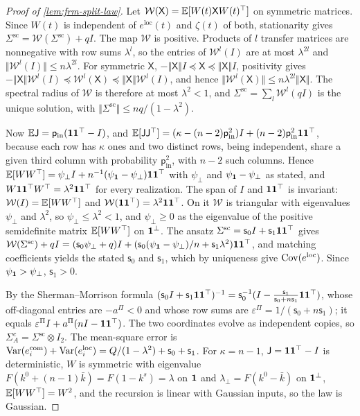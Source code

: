 \begin{proof}[Proof of \cref{lem:frm-split-law}]
Let $\mathcal W(\mathsf X)=\mathbb{E}[W(t)\mathsf XW(t)^\top]$ on symmetric matrices. Since $W(t)$ is independent of $e^{\mathrm{loc}}(t)$ and $\zeta(t)$ of both, stationarity gives $\Sigma^{\mathrm{sc}}=\mathcal W(\Sigma^{\mathrm{sc}})+qI$. The map $\mathcal W$ is positive. Products of $l$ transfer matrices are nonnegative with row sums $\lambda^l$, so the entries of $\mathcal W^l(I)$ are at most $\lambda^{2l}$ and $\Vert\mathcal W^l(I)\Vert\le n\lambda^{2l}$. For symmetric $\mathsf X$, $-\Vert\mathsf X\Vert I\preceq\mathsf X\preceq\Vert\mathsf X\Vert I$, positivity gives $-\Vert\mathsf X\Vert\mathcal W^l(I)\preceq\mathcal W^l(\mathsf X)\preceq\Vert\mathsf X\Vert\mathcal W^l(I)$, and hence $\Vert\mathcal W^l(\mathsf X)\Vert\le n\lambda^{2l}\Vert\mathsf X\Vert$. The spectral radius of $\mathcal W$ is therefore at most $\lambda^2<1$, and $\Sigma^{\mathrm{sc}}=\sum_l\mathcal W^l(qI)$ is the unique solution, with $\Vert\Sigma^{\mathrm{sc}}\Vert\le nq/(1-\lambda^2)$.

Now $\mathbb{E}\mathsf J=\mathsf p_{\mathrm{in}}(\mathbf{1}\mathbf{1}^\top-I)$, and $\mathbb{E}[\mathsf J\mathsf J^\top]=(\kappa-(n-2)\mathsf p_{\mathrm{in}}^2)I+(n-2)\mathsf p_{\mathrm{in}}^2\mathbf{1}\mathbf{1}^\top$, because each row has $\kappa$ ones and two distinct rows, being independent, share a given third column with probability $\mathsf p_{\mathrm{in}}^2$, with $n-2$ such columns. Hence $\mathbb{E}[WW^\top]=\psi_\perp I+n^{-1}(\psi_{\mathbf{1}}-\psi_\perp)\mathbf{1}\mathbf{1}^\top$ with $\psi_\perp$ and $\psi_{\mathbf{1}}-\psi_\perp$ as stated, and $W\mathbf{1}\mathbf{1}^\top W^\top=\lambda^2\mathbf{1}\mathbf{1}^\top$ for every realization. The span of $I$ and $\mathbf{1}\mathbf{1}^\top$ is invariant: $\mathcal W(I)=\mathbb{E}[WW^\top]$ and $\mathcal W(\mathbf{1}\mathbf{1}^\top)=\lambda^2\mathbf{1}\mathbf{1}^\top$. On it $\mathcal W$ is triangular with eigenvalues $\psi_\perp$ and $\lambda^2$, so $\psi_\perp\le\lambda^2<1$, and $\psi_\perp\ge0$ as the eigenvalue of the positive semidefinite matrix $\mathbb{E}[WW^\top]$ on $\mathbf{1}^\perp$. The ansatz $\Sigma^{\mathrm{sc}}=\mathsf s_0I+\mathsf s_1\mathbf{1}\mathbf{1}^\top$ gives $\mathcal W(\Sigma^{\mathrm{sc}})+qI=(\mathsf s_0\psi_\perp+q)I+(\mathsf s_0(\psi_{\mathbf{1}}-\psi_\perp)/n+\mathsf s_1\lambda^2)\mathbf{1}\mathbf{1}^\top$, and matching coefficients yields the stated $\mathsf s_0$ and $\mathsf s_1$, which by uniqueness give $\operatorname{Cov}(e^{\mathrm{loc}})$. Since $\psi_{\mathbf{1}}>\psi_\perp$, $\mathsf s_1>0$.

By the Sherman--Morrison formula $(\mathsf s_0I+\mathsf s_1\mathbf{1}\mathbf{1}^\top)^{-1}=\mathsf s_0^{-1}(I-\frac{\mathsf s_1}{\mathsf s_0+n\mathsf s_1}\mathbf{1}\mathbf{1}^\top)$, whose off-diagonal entries are $-a^\Pi<0$ and whose row sums are $\varepsilon^\Pi=1/(\mathsf s_0+n\mathsf s_1)$; it equals $\varepsilon^\Pi I+a^\Pi(nI-\mathbf{1}\mathbf{1}^\top)$. The two coordinates evolve as independent copies, so $\Sigma^c_A=\Sigma^{\mathrm{sc}}\otimes I_2$. The mean-square error is $\operatorname{Var}(e^{\mathrm{com}}_i)+\operatorname{Var}(e^{\mathrm{loc}}_i)=Q/(1-\lambda^2)+\mathsf s_0+\mathsf s_1$. For $\kappa=n-1$, $\mathsf J=\mathbf{1}\mathbf{1}^\top-I$ is deterministic, $W$ is symmetric with eigenvalue $F(k^0+(n-1)\bar k)=F(1-k^s)=\lambda$ on $\mathbf{1}$ and $\lambda_\perp=F(k^0-\bar k)$ on $\mathbf{1}^\perp$, $\mathbb{E}[WW^\top]=W^2$, and the recursion is linear with Gaussian inputs, so the law is Gaussian.
\end{proof}

